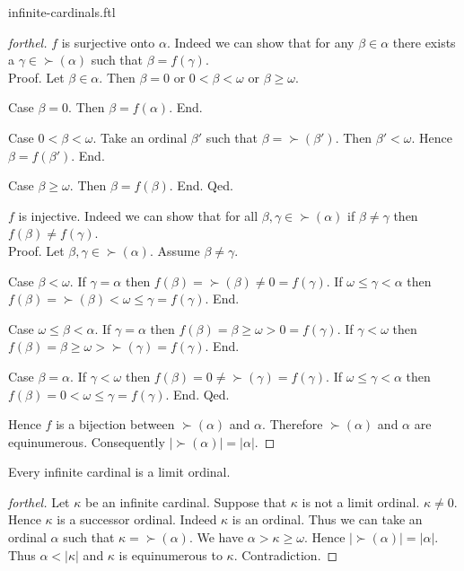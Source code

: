 \documentclass{naproche-library}
\begin{document}
\begin{smodule}{infinite-cardinals.ftl}
\begin{proof}[forthel]
    $f$ is surjective onto $\alpha$.
    Indeed we can show that for any $\beta \in \alpha$ there exists a
    $\gamma \in \succ(\alpha)$ such that $\beta = f(\gamma)$. \\
    Proof.
      Let $\beta \in \alpha$.
      Then $\beta = 0$ or $0 < \beta < \omega$ or $\beta \geq \omega$.

      Case $\beta = 0$.
        Then $\beta = f(\alpha)$.
      End.

      Case $0 < \beta < \omega$.
        Take an ordinal $\beta'$ such that $\beta = \succ(\beta')$.
        Then $\beta' < \omega$.
        Hence $\beta = f(\beta')$.
      End.

      Case $\beta \geq \omega$.
        Then $\beta = f(\beta)$.
      End.
    Qed.

    $f$ is injective.
    Indeed we can show that for all $\beta, \gamma \in \succ(\alpha)$ if
    $\beta \neq \gamma$ then $f(\beta) \neq f(\gamma)$. \\
    Proof.
      Let $\beta, \gamma \in \succ(\alpha)$.
      Assume $\beta \neq \gamma$.

      Case $\beta < \omega$.
        If $\gamma = \alpha$ then
        $f(\beta)
          = \succ(\beta)
          \neq 0
          = f(\gamma)$.
        If $\omega \leq \gamma < \alpha$ then
        $f(\beta)
          = \succ(\beta)
          < \omega
          \leq \gamma
          = f(\gamma)$.
      End.

      Case $\omega \leq \beta < \alpha$.
        If $\gamma = \alpha$ then
        $f(\beta)
          = \beta
          \geq \omega
          > 0
          = f(\gamma)$.
        If $\gamma < \omega$ then
        $f(\beta)
          = \beta
          \geq \omega
          > \succ(\gamma)
          = f(\gamma)$.
      End.

      Case $\beta = \alpha$.
        If $\gamma < \omega$ then
        $f(\beta)
          = 0
          \neq \succ(\gamma)
          = f(\gamma)$.
        If $\omega \leq \gamma < \alpha$ then
        $f(\beta)
          = 0
          < \omega
          \leq \gamma
          = f(\gamma)$.
      End.
    Qed.

    Hence $f$ is a bijection between $\succ(\alpha)$ and $\alpha$.
    Therefore $\succ(\alpha)$ and $\alpha$ are equinumerous.
    Consequently $|\succ(\alpha)| = |\alpha|$.
  \end{proof}

  \begin{proposition}[forthel,id=SET_THEORY_07_8700732632989696,printid]
    Every infinite cardinal is a limit ordinal.
  \end{proposition}
  \begin{proof}[forthel]
    Let $\kappa$ be an infinite cardinal.
    Suppose that $\kappa$ is not a limit ordinal.
    $\kappa \neq 0$.
    Hence $\kappa$ is a successor ordinal.
    Indeed $\kappa$ is an ordinal.
    Thus we can take an ordinal $\alpha$ such that $\kappa = \succ(\alpha)$.
    We have $\alpha > \kappa \geq \omega$.
    Hence $|\succ(\alpha)| = |\alpha|$.
    Thus $\alpha < |\kappa|$ and $\kappa$ is equinumerous to $\kappa$.
    Contradiction.
  \end{proof}
\end{smodule}
\end{document}

